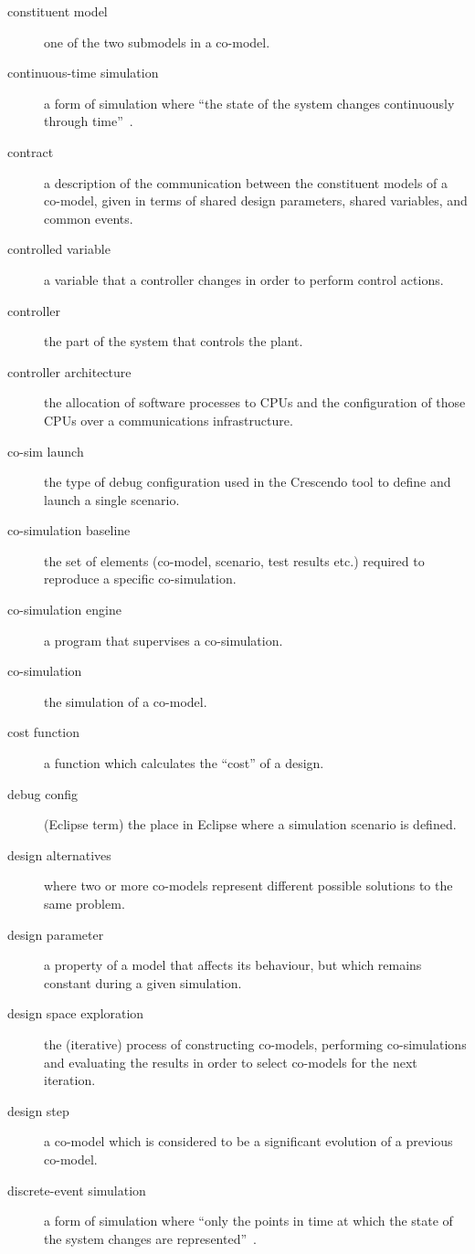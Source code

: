 \documentclass{crescendorepchap}
\begin{document}
\begin{description}
\item[constituent model] one of the two submodels in a co-model.
\item[continuous-time simulation] a form of simulation where ``the state of the system changes continuously through time''~\cite[p.~15]{Robinson04}.
\item[contract] a description of the communication between the constituent models of a co-model, given in terms of shared design parameters, shared variables, and common events.
\item[controlled variable] a variable that a controller changes in order to perform control actions.
\item[controller] the part of the system that controls the plant.
\item[controller architecture] the allocation of software processes to CPUs and the configuration of those CPUs over a communications infrastructure.
\item[co-sim launch] the type of debug configuration used in the Crescendo tool to define and launch a single scenario.
\item[co-simulation baseline] the set of elements (co-model, scenario, test results etc.) required to reproduce a specific co-simulation.
\item[co-simulation engine] a program that supervises a co-simulation.
\item[co-simulation] the simulation of a co-model.
\item[cost function] a function which calculates the ``cost'' of a design.
\item[debug config] (Eclipse term) the place in Eclipse where a simulation scenario is defined.
\item[design alternatives] where two or more co-models represent different possible solutions to the same problem.
\item[design parameter] a property of a model that affects its behaviour, but which remains constant during a given simulation.
\item[design space exploration] the (iterative) process of constructing co-models, performing co-simulations and evaluating the results in order to select co-models for the next iteration.
\item[design step] a co-model which is considered to be a significant evolution of a previous co-model.
\item[discrete-event simulation] a form of simulation where ``only the points in time at which the state of the system changes are represented''~\cite[p.~15]{Robinson04}.

\end{description}
\end{document}
